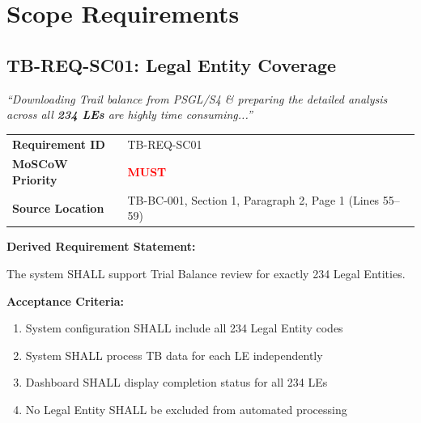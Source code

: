 \documentclass[11pt,a4paper,twoside]{report}
\begin{document}
\section{Scope Requirements}
\label{sec:req-scope}

\subsection{TB-REQ-SC01: Legal Entity Coverage}
\label{req:tb-req-sc01}

\begin{tcolorbox}[colback=sourcegreen!5,colframe=sourcegreen!70,title=Source Quotation]
\textit{``Downloading Trail balance from PSGL/S4 \& preparing the detailed
analysis across all \textbf{234 LEs} are highly time consuming...''}
\end{tcolorbox}

\begin{tabularx}{\textwidth}{@{}lX@{}}
\toprule
\textbf{Requirement ID} & TB-REQ-SC01 \\
\textbf{MoSCoW Priority} & \textcolor{red}{\textbf{MUST}} \\
\textbf{Source Location} & TB-BC-001, Section 1, Paragraph 2, Page 1 (Lines 55--59) \\
\bottomrule
\end{tabularx}

\vspace{0.5em}
\textbf{Derived Requirement Statement:}

The system SHALL support Trial Balance review for exactly 234 Legal Entities.

\textbf{Acceptance Criteria:}
\begin{enumerate}[label=AC-SC01-\arabic*:,leftmargin=*]
\item System configuration SHALL include all 234 Legal Entity codes
\item System SHALL process TB data for each LE independently
\item Dashboard SHALL display completion status for all 234 LEs
\item No Legal Entity SHALL be excluded from automated processing
\end{enumerate}
\end{document}
